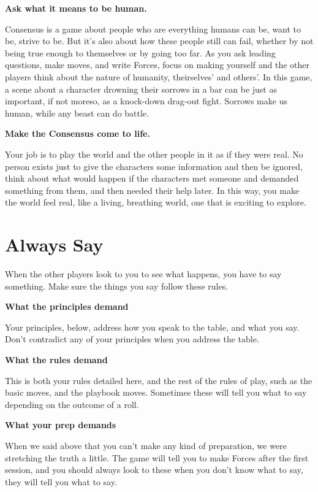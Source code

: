 \documentclass[
  oneside,
  statementpaper,
  9pt]{memoir}
\begin{document}
\textbf{Ask what it means to be human.}

Consensus is a game about people who are everything humans can be, want
to be, strive to be. But it's also about how these people still can
fail, whether by not being true enough to themselves or by going too
far. As you ask leading questions, make moves, and write Forces, focus
on making yourself and the other players think about the nature of
humanity, theirselves' and others'. In this game, a scene about a
character drowning their sorrows in a bar can be just as important, if
not moreso, as a knock-down drag-out fight. Sorrows make us human, while
any beast can do battle.

\textbf{Make the Consensus come to life.}

Your job is to play the world and the other people in it as if they were
real. No person exists just to give the characters some information and
then be ignored, think about what would happen if the characters met
someone and demanded something from them, and then needed their help
later. In this way, you make the world feel real, like a living,
breathing world, one that is exciting to explore.

\hypertarget{always-say}{%
\section{Always Say}\label{always-say}}

When the other players look to you to see what happens, you have to say
something. Make sure the things you say follow these rules.

\textbf{What the principles demand}

Your principles, below, address how you speak to the table, and what you
say. Don't contradict any of your principles when you address the table.

\textbf{What the rules demand}

This is both your rules detailed here, and the rest of the rules of
play, such as the basic moves, and the playbook moves. Sometimes these
will tell you what to say depending on the outcome of a roll.

\textbf{What your prep demands}

When we said above that you can't make any kind of preparation, we were
stretching the truth a little. The game will tell you to make Forces
after the first session, and you should always look to these when you
don't know what to say, they will tell you what to say.
\end{document}
